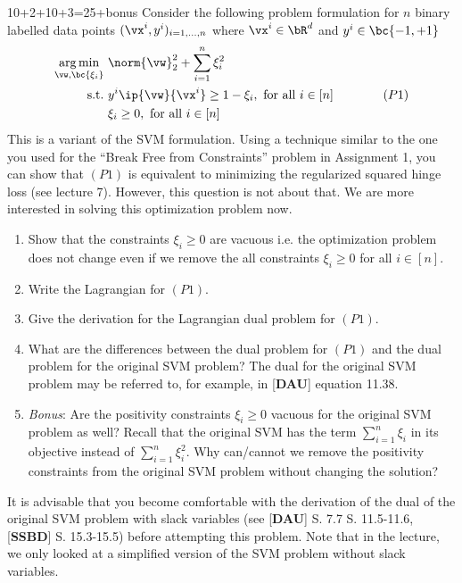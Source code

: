 \documentclass[a4paper,11pt]{article}
\begin{document}
\begin{mlproblem}{10+2+10+3=25+bonus}
Consider the following problem formulation for $n$ binary labelled data points $(\vx^i,y^i)_{i=1,\ldots,n}$ where $\vx^i \in \bR^d$ and $y^i \in \bc{-1,+1}$
\begin{align*}
\underset{\vw,\bc{\xi_i}}{\arg\min}&\ \norm{\vw}_2^2 + \sum_{i=1}^n\xi_i^2\\
\text{s.t.} &\ y^i\ip{\vw}{\vx^i} \geq 1 - \xi_i, \text{ for all } i \in [n] \qquad\qquad{(P1)}\\
&\ \xi_i \geq 0, \text{ for all } i \in [n]
\end{align*}
This is a variant of the SVM formulation. Using a technique similar to the one you used for the ``Break Free from Constraints'' problem in Assignment 1, you can show that $(P1)$ is equivalent to minimizing the regularized squared hinge loss (see lecture 7). However, this question is not about that. We are more interested in solving this optimization problem now.
\begin{enumerate}
	\item Show that the constraints $\xi_i \geq 0$ are vacuous i.e. the optimization problem does not change even if we remove the all constraints $\xi_i \geq 0$ for all $i \in [n]$.
	\item Write the Lagrangian for $(P1)$.
	\item Give the derivation for the Lagrangian dual problem for $(P1)$.
	\item What are the differences between the dual problem for $(P1)$ and the dual problem for the original SVM problem? The dual for the original SVM problem may be referred to, for example, in [\textbf{DAU}] equation 11.38.
	\item \emph{Bonus}: Are the positivity constraints $\xi_i \geq 0$ vacuous for the original SVM problem as well? Recall that the original SVM has the term $\sum_{i=1}^n\xi_i$ in its objective instead of $\sum_{i=1}^n\xi_i^2$. Why can/cannot we remove the positivity constraints from the original SVM problem without changing the solution?
\end{enumerate}
It is advisable that you become comfortable with the derivation of the dual of the original SVM problem with slack variables (see [\textbf{DAU}] S. 7.7 S. 11.5-11.6, [\textbf{SSBD}] S. 15.3-15.5) before attempting this problem. Note that in the lecture, we only looked at a simplified version of the SVM problem without slack variables.
\end{mlproblem}
\end{document}
